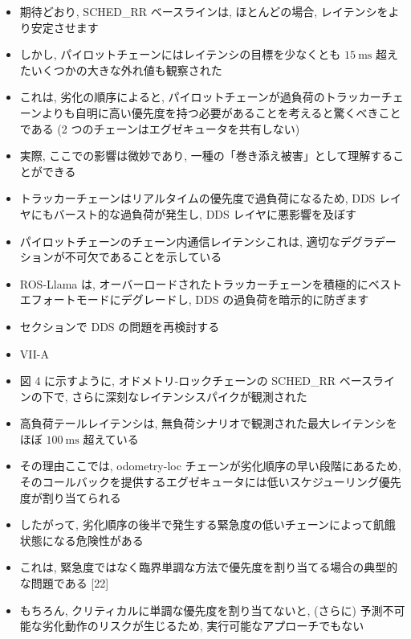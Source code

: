 \begin{frame}{}
    \begin{itemize}
        \item 期待どおり, SCHED\_RR ベースラインは, ほとんどの場合, レイテンシをより安定させます
\item しかし, パイロットチェーンにはレイテンシの目標を少なくとも $15 \mathrm{~ms}$ 超えたいくつかの大きな外れ値も観察された
\item これは, 劣化の順序によると, パイロットチェーンが過負荷のトラッカーチェーンよりも自明に高い優先度を持つ必要があることを考えると驚くべきことである (2 つのチェーンはエグゼキュータを共有しない)
    \end{itemize}
\end{frame}

\begin{frame}{}
    \begin{itemize}
        \item 実際, ここでの影響は微妙であり, 一種の「巻き添え被害」として理解することができる
\item トラッカーチェーンはリアルタイムの優先度で過負荷になるため, DDS レイヤにもバースト的な過負荷が発生し, DDS レイヤに悪影響を及ぼす
\item パイロットチェーンのチェーン内通信レイテンシこれは, 適切なデグラデーションが不可欠であることを示している
\item ROS-Llama は, オーバーロードされたトラッカーチェーンを積極的にベストエフォートモードにデグレードし, DDS の過負荷を暗示的に防ぎます
\item セクションで DDS の問題を再検討する
\item VII-A
    \end{itemize}
\end{frame}

\begin{frame}{}
    \begin{itemize}
        \item 図 4 に示すように, オドメトリ-ロックチェーンの SCHED\_RR ベースラインの下で, さらに深刻なレイテンシスパイクが観測された
\item 高負荷テールレイテンシは, 無負荷シナリオで観測された最大レイテンシをほぼ $100 \mathrm{~ms}$ 超えている
\item その理由ここでは, odometry-loc チェーンが劣化順序の早い段階にあるため, そのコールバックを提供するエグゼキュータには低いスケジューリング優先度が割り当てられる
\item したがって, 劣化順序の後半で発生する緊急度の低いチェーンによって飢餓状態になる危険性がある
\item これは, 緊急度ではなく臨界単調な方法で優先度を割り当てる場合の典型的な問題である [22]
\item もちろん, クリティカルに単調な優先度を割り当てないと, (さらに) 予測不可能な劣化動作のリスクが生じるため, 実行可能なアプローチでもない
    \end{itemize}
\end{frame}

